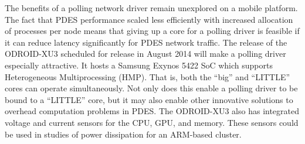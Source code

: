 \documentclass[11pt]{book}
\begin{document}
The benefits of a polling network driver remain unexplored on a mobile platform.  The fact
that PDES performance scaled less efficiently with increased allocation of processes per
node means that giving up a core for a polling driver is feasible if it can reduce latency
significantly for PDES network traffic.  The release of the ODROID-XU3 \cite{xu3}
scheduled for release in August 2014 will make a polling driver especially attractive.  It
hosts a Samsung Exynos 5422 SoC which supports Heterogeneous Multiprocessing (HMP).  That
is, both the ``big'' and ``LITTLE'' cores can operate simultaneously. Not only does this
enable a polling driver to be bound to a ``LITTLE'' core, but it may also enable other
innovative solutions to overhead computation problems in PDES.  The ODROID-XU3 also has
integrated voltage and current sensors for the CPU, GPU, and memory.  These sensors could
be used in studies of power dissipation for an ARM-based cluster.

\newpage
 

\end{document}
